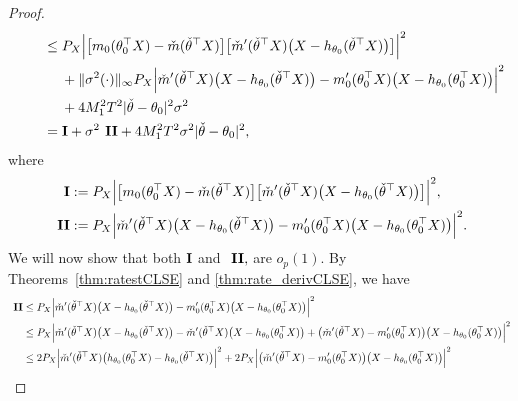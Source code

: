 {\begin{proof}
\begin{align}
\qquad&\le P_X \Big| \big[ m_0(\theta_0 ^\top X)-\check{m}(\check{\theta}^\top X)\big] \big[\check{m}^\prime(\check{\theta} ^\top X) \big(X -  h_{\theta_0}(\check{\theta} ^\top X)\big)\big]\Big|^2 \\
&\quad\; +  \|\sigma^2(\cdot)\|_\infty P_X \Big|  \check{m}^\prime(\check{\theta} ^\top X) \big(X -  h_{\theta_0}(\check{\theta} ^\top X)\big) -m_0^\prime(\theta_0^\top X) \big(X - h_{\theta_0} (\theta_0^\top X)\big) \Big|^2\\
&\quad\; + 4 M_1^2 T^2 |\check\theta-\theta_0|^2\sigma^2\\
% 
\qquad&=\textbf{\Rome{1}} + \sigma^2 \textbf{ \Rome{2}}+  4 M_1^2 T^2  \sigma^2 |\check\theta-\theta_0|^2, \label{eq:consis_11}
\end{align}
where
\begin{align}\label{eq:roja_jane}
\begin{split}
\textbf{\Rome{1}} &:= P_X \Big| \big[ m_0(\theta_0 ^\top X)-\check{m}(\check{\theta}^\top X)\big] \big[\check{m}^\prime(\check{\theta} ^\top X) \big(X -  h_{\theta_0}(\check{\theta} ^\top X)\big)\big]\Big|^2, \\
  \textbf{ \Rome{2}} &:=   P_X \Big|  \check{m}^\prime(\check{\theta} ^\top X) \big(X -  h_{\theta_0}(\check{\theta} ^\top X)\big) -m_0^\prime(\theta_0^\top X) \big(X - h_{\theta_0} (\theta_0^\top X)\big) \Big|^2.
\end{split}
\end{align}
We will now show that both $\textbf{\Rome{1}} $ and $\textbf{ \Rome{2}},$ are $o_p(1).$  By Theorems~\ref{thm:ratestCLSE} and \ref{thm:rate_derivCLSE}, we have
{\small \begin{align*}
 \textbf{ \Rome{2}} \le{}& P_X \Big|  \check{m}^\prime(\check{\theta} ^\top X) \big(X -  h_{\theta_0}(\check{\theta} ^\top X)\big) -m_0^\prime(\theta_0^\top X) \big(X - h_{\theta_0} (\theta_0^\top X)\big) \Big|^2\\
 \le{}& P_X \Big|  \check{m}^\prime(\check{\theta} ^\top X) \big(X -  h_{\theta_0}(\check{\theta} ^\top X)\big)- \check{m}^\prime(\check{\theta} ^\top X) \big(X -  h_{\theta_0}(\theta_0 ^\top X)\big)+ \big(\check{m}^\prime(\check{\theta} ^\top X)  -m_0^\prime(\theta_0^\top X)\big) \big(X - h_{\theta_0} (\theta_0^\top X)\big) \Big|^2\\
  \le{}&  2 P_X \Big|  \check{m}^\prime(\check{\theta} ^\top X) \big(h_{\theta_0}(\theta_0 ^\top X) -  h_{\theta_0}(\check{\theta} ^\top X)\big)\Big|^2+ 2P_X \Big|\big(\check{m}^\prime(\check{\theta} ^\top X)  -m_0^\prime(\theta_0^\top X)\big) \big(X - h_{\theta_0} (\theta_0^\top X)\big) \Big|^2\\

\end{align*}}
\end{proof}}

